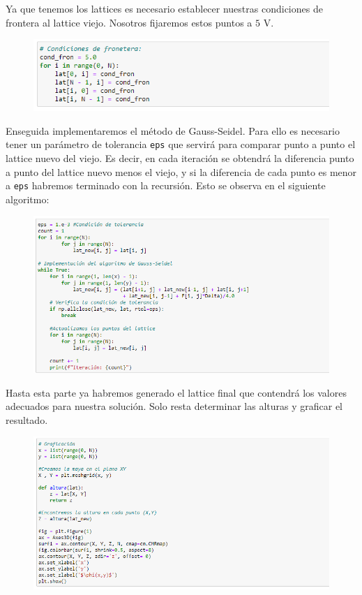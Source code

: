 \documentclass[11pt]{article}
\begin{document}
	Ya que tenemos los lattices es necesario establecer nuestras condiciones de frontera al lattice viejo. Nosotros fijaremos estos puntos a $5$ V.
		\begin{figure}[h!]
		\centering
		\includegraphics[width=13cm]{Img/1.4.PNG}
	\end{figure}

	Enseguida implementaremos el método de Gauss-Seidel. Para ello es necesario tener un parámetro de tolerancia \texttt{eps} que servirá para comparar punto a punto el lattice nuevo del viejo. Es decir, en cada iteración se obtendrá la diferencia punto a punto del lattice nuevo menos el viejo, y si la diferencia de cada punto es menor a \texttt{eps} habremos terminado con la recursión. Esto se observa en el siguiente algoritmo:
\newpage
	\begin{figure}[h!]
		\centering
		\includegraphics[width=13cm]{Img/1.5.PNG}
	\end{figure}

	Hasta esta parte ya habremos generado el lattice final que contendrá los valores adecuados para nuestra solución. Solo resta determinar las alturas y graficar el resultado.
	\begin{figure}[h!]
		\centering
		\includegraphics[width=13cm]{Img/1.6.PNG}
	\end{figure}
	
\end{document}
